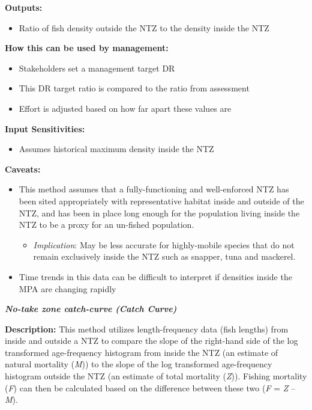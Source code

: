 \documentclass[]{book}
\providecommand{\tightlist}{%
  \setlength{\itemsep}{0pt}\setlength{\parskip}{0pt}}
\begin{document}
\textbf{Outputs: }

\begin{itemize}
\tightlist
\item
  Ratio of fish density outside the NTZ to the density inside the NTZ
\end{itemize}

\textbf{How this can be used by management:}

\begin{itemize}
\item
  Stakeholders set a management target DR
\item
  This DR target ratio is compared to the ratio from assessment
\item
  Effort is adjusted based on how far apart these values are
\end{itemize}

\textbf{Input Sensitivities: }

\begin{itemize}
\tightlist
\item
  Assumes historical maximum density inside the NTZ
\end{itemize}

\textbf{Caveats:}

\begin{itemize}
\item
  This method assumes that a fully-functioning and well-enforced NTZ has
  been sited appropriately with representative habitat inside and
  outside of the NTZ, and has been in place long enough for the
  population living inside the NTZ to be a proxy for an un-fished
  population.

  \begin{itemize}
  \tightlist
  \item
    \emph{Implication}: May be less accurate for highly-mobile species
    that do not remain exclusively inside the NTZ such as snapper, tuna
    and mackerel.
  \end{itemize}
\item
  Time trends in this data can be difficult to interpret if densities
  inside the MPA are changing rapidly
\end{itemize}

\textbf{\emph{No-take zone catch-curve (Catch Curve)}}

\textbf{Description:} This method utilizes length-frequency data (fish
lengths) from inside and outside a NTZ to compare the slope of the
right-hand side of the log transformed age-frequency histogram from
inside the NTZ (an estimate of natural mortality (\emph{M})) to the
slope of the log transformed age-frequency histogram outside the NTZ (an
estimate of total mortality (\emph{Z})). Fishing mortality (\emph{F})
can then be calculated based on the difference between these two
(\emph{F} = \emph{Z} -- \emph{M}).
\end{document}
